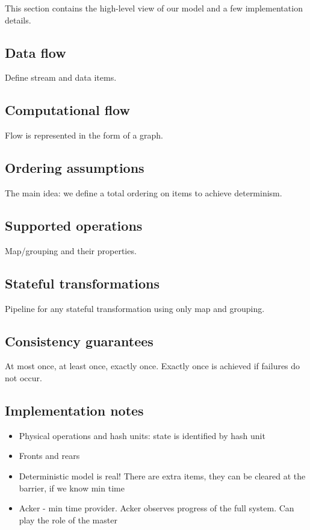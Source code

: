 
\label {fs-model-seciton}

This section contains the high-level view of our model and a few implementation details.

\subsection{Data flow}
Define stream and data items.

\subsection{Computational flow}
Flow is represented in the form of a graph.

\subsection{Ordering assumptions}
The main idea: we define a total ordering on items to achieve determinism.

\subsection{Supported operations}
Map/grouping and their properties.

\subsection{Stateful transformations}
Pipeline for any stateful transformation using only map and grouping. 

\subsection{Consistency guarantees}
At most once, at least once, exactly once. Exactly once is achieved if failures do not occur.

\subsection{Implementation notes}

\begin{itemize}
    \item Physical operations and hash units: state is identified by hash unit
    \item Fronts and rears
    \item Deterministic model is real! There are extra items, they can be cleared at the barrier, if we know min time  %
    \item Acker - min time provider. Acker observes progress of the full system. Can play the role of the master %
\end{itemize}